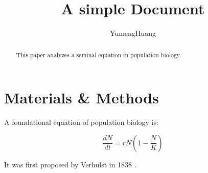 \documentclass[12pt]{article}
\title{A simple Document}
\author{YumengHuang}
\date{}
\begin{document}
 \maketitle

 \begin{abstract}
  This paper analyzes a seminal equation in population biology.
 \end{abstract}

 \section{Materials \& Methods}

 A foundational equation of population biology is:

 \begin{equation}
    \frac{dN}{dt} = r N (1 - \frac{N}{K})
 \end{equation}

 It was first proposed by Verhulst in 1838 \cite{verhulst1838notice}.

 

 
\end{document}

